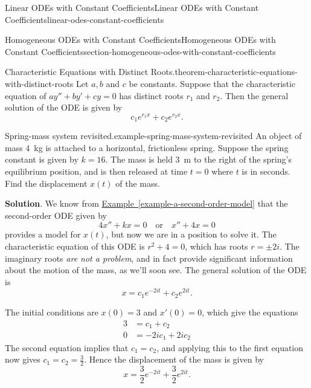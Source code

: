 \documentclass[oneside,10pt,]{book}
\numberwithin{equation}{section}
\newcommand{\amp}{&}
\begin{document}
\begin{chapterptx}{Linear ODEs with Constant Coefficients}{}{Linear ODEs with Constant Coefficients}{}{}{linear-odes-constant-coefficients}
\begin{sectionptx}{Homogeneous ODEs with Constant Coefficients}{}{Homogeneous ODEs with Constant Coefficients}{}{}{section-homogeneous-odes-with-constant-coefficients}
\begin{theorem}{Characteristic Equations with Distinct Roots.}{}{theorem-characteristic-equations-with-distinct-roots}%
\hypertarget{p-185}{}%
Let \(a,b\) and \(c\) be constants. Suppose that the characteristic equation of \(ay'' + by' + cy = 0\) has distinct roots \(r_{1}\) and \(r_{2}\). Then the general solution of the ODE is given by%
\begin{equation*}
c_{1}e^{r_{1}x} + c_{2}e^{r_{2}x}.
\end{equation*}
%
\end{theorem}
\begin{example}{Spring-mass system revisited.}{example-spring-mass-system-revisited}%
\hypertarget{p-186}{}%
An object of mass \SI{4}{\kilo\gram} is attached to a horizontal, frictionless spring. Suppose the spring constant is given by \(k=16\). The mass is held \SI{3}{\meter} to the right of the spring's equilibrium position, and is then released at time \(t=0\) where \(t\) is in seconds. Find the displacement \(x(t)\) of the mass.%
\par\smallskip%
\noindent\textbf{Solution}.\hypertarget{solution-28}{}\quad%
\hypertarget{p-187}{}%
We know from \hyperref[example-a-second-order-model]{Example~\ref{example-a-second-order-model}} that the second-order ODE given by%
\begin{equation*}
4x'' + kx = 0\quad\text{or}\quad x'' + 4x = 0
\end{equation*}
provides a model for \(x(t)\), but now we are in a position to solve it. The characteristic equation of this ODE is \(r^{2} + 4 = 0\), which has roots \(r=\pm2i\). The imaginary roots \emph{are not a problem}, and in fact provide significant information about the motion of the mass, as we'll soon see. The general solution of the ODE is%
\begin{equation*}
x = c_{1}e^{-2it} + c_{2}e^{2it}.
\end{equation*}
%
\par
\hypertarget{p-188}{}%
The initial conditions are \(x(0) = 3\) and \(x'(0) = 0\), which give the equations%
\begin{align*}
3 \amp = c_{1} + c_{2} \\
0 \amp = -2ic_{1} + 2ic_{2} 
\end{align*}
The second equation implies that \(c_{1} = c_{2}\), and applying this to the first equation now gives \(c_{1} = c_{2} = \frac{3}{2}\). Hence the displacement of the mass is given by%
\begin{equation*}
x = \frac{3}{2}e^{-2it} + \frac{3}{2}e^{2it}.

\end{equation*}
\end{example}
\end{sectionptx}
\end{chapterptx}
\end{document}
